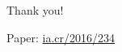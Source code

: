 \documentclass{beamer}
\begin{document}
				\begin{frame}

					\begin{center}
						{\Large Thank you!}
			
						\vspace{1cm}
						Paper: \href{http://ia.cr/2016/234}{ia.cr/2016/234}
					\end{center}
				\end{frame}
	


			
\end{document}
